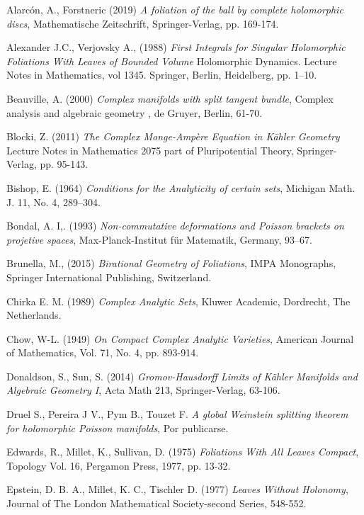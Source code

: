 \documentclass[letterpaper]{book}
\begin{document}
\begin{thebibliography}{3}

 Alarc\'on, A., Forstneric (2019) \textit{A foliation of the ball by complete holomorphic discs}, Mathematische Zeitschrift,
Springer-Verlag, pp. 169-174.

 Alexander J.C., Verjovsky A., (1988) \textit{First Integrals for Singular Holomorphic Foliations With Leaves of Bounded Volume}
Holomorphic Dynamics. Lecture Notes in Mathematics, vol 1345. Springer, Berlin, Heidelberg, pp. 1–10.

 Beauville, A. (2000) \textit{Complex manifolds with split tangent bundle}, Complex analysis and algebraic geometry
, de Gruyer, Berlin, 61-70.

 Blocki, Z. (2011) \textit{The Complex Monge-Amp\`ere Equation in K\"ahler Geometry} Lecture Notes in Mathematics 2075
part of Pluripotential Theory, Springer-Verlag, pp. 95-143.

 Bishop, E. (1964) \textit{Conditions for the Analyticity  of certain sets}, Michigan Math. J. 11, No. 4, 289--304.

 Bondal, A. I,. (1993) \textit{Non-commutative deformations and Poisson brackets on projetive spaces},
Max-Planck-Institut f\"ur Matematik, Germany, 93–67.

 Brunella, M., (2015) \textit{Birational Geometry of Foliations}, IMPA Monographs,
Springer International Publishing, Switzerland.

 Chirka E. M. (1989) \textit{Complex Analytic Sets}, Kluwer
Academic, Dordrecht, The Netherlands.

 Chow, W-L. (1949) \textit{On Compact Complex Analytic Varieties},
American Journal of Mathematics, Vol. 71, No. 4, pp. 893-914.

 Donaldson, S., Sun, S. (2014) \textit{Gromov-Hausdorff Limits of K\"ahler Manifolds and Algebraic Geometry I},
 Acta Math 213, Springer-Verlag, 63-106.

Druel S., Pereira J V., Pym B., Touzet F. \textit{A global Weinstein splitting theorem for
holomorphic Poisson manifolds}, Por publicarse.

 Edwards, R., Millet, K., Sullivan, D. (1975) \textit{Foliations
With All Leaves Compact}, Topology Vol. 16, Pergamon Press, 1977, pp. 13-32.

 Epstein, D. B. A., Millet, K. C., Tischler D.
(1977) \textit{Leaves Without Holonomy}, Journal of The London Mathematical Society-second Series, 548-552.


\end{thebibliography}
\end{document}

